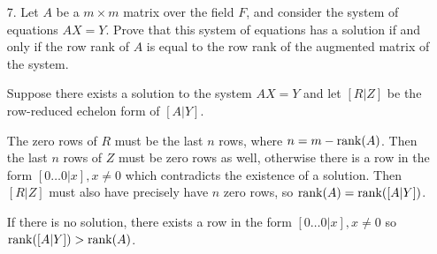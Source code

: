 \documentclass{article}
\begin{document}
\begin{enumerate}[listparindent=\parindent]
\item[7.] Let \(A\) be a \(m \times m\) matrix over the field \(F\), and consider the system of equations \(AX = Y\).
    Prove that this system of equations has a solution if and only if the row rank of \(A\) is equal to the row rank
    of the augmented matrix of the system.
    
    Suppose there exists a solution to the system \(AX = Y\) and let \([R | Z]\) be the row-reduced echelon form of \([A | Y]\).

    The zero rows of \(R\) must be the last \(n\) rows, where \(n = m - \operatorname{rank}(A)\).
    Then the last \(n\) rows of \(Z\) must be zero rows as well,
    otherwise there is a row in the form \([0 \dots 0 | x], x \neq 0\) which contradicts the existence of a solution.
    Then \([R | Z]\) must also have precisely have \(n\) zero rows, so \(\operatorname{rank}(A) = \operatorname{rank}([A | Y])\).

    If there is no solution, there exists a row in the form \([0 \dots 0 | x], x \neq 0\) so \(\operatorname{rank}([A | Y]) > \operatorname{rank}(A)\).

\end{enumerate}
\end{document}
